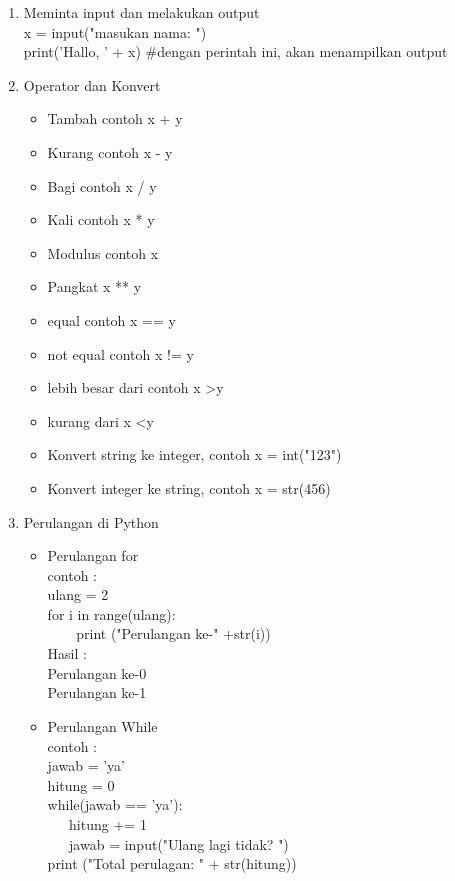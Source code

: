\begin{enumerate}
\item Meminta input dan melakukan output\\
x = input("masukan nama: ")\\
print('Hallo, ' + x) \#dengan perintah ini, akan menampilkan output\\

\item Operator dan Konvert
\begin{itemize}
\item Tambah contoh x + y
\item Kurang contoh x - y
\item Bagi contoh x / y
\item Kali contoh x * y
\item Modulus contoh x %
\item Pangkat x ** y
\item equal contoh x == y
\item not equal contoh x != y
\item lebih besar dari contoh x \textgreater  y
\item kurang dari x \textless y
\item Konvert string ke integer, contoh x = int("123")
\item Konvert integer ke string, contoh x = str(456)
\end{itemize}

\item Perulangan di Python
\begin{itemize}
\item Perulangan for\\
contoh :\\
ulang = 2\\
for i in range(ulang):\\
\verb|    |print ("Perulangan ke-" +str(i))\\
Hasil :\\
Perulangan ke-0\\
Perulangan ke-1\\
\item Perulangan While\\
contoh :\\
jawab = 'ya'\\
hitung = 0\\
while(jawab == 'ya'):\\
\verb|   |hitung += 1\\
\verb|   |jawab = input("Ulang lagi tidak? ")\\
print ("Total perulagan: " + str(hitung))\\
\end{itemize}


\end{enumerate}
